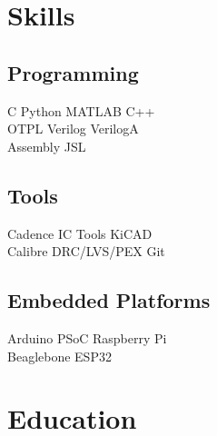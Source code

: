 \documentclass[]{deedy-resume-openfont}
\begin{document}
%
%

%
%

%
%

\begin{minipage}[t]{0.31\textwidth} 

\section{Skills}
\subsection{Programming}
C \textbullet{}   Python \textbullet{} MATLAB \textbullet{} C++ \\ 
OTPL \textbullet{} Verilog \textbullet{} VerilogA \\
Assembly \textbullet{} JSL
\sectionsep

\subsection{Tools}
Cadence IC Tools \textbullet{} KiCAD \\
Calibre DRC/LVS/PEX \textbullet{} Git
\sectionsep

\subsection{Embedded Platforms}
Arduino \textbullet{} PSoC \textbullet{} Raspberry Pi\\
Beaglebone \textbullet{} ESP32
\sectionsep


\section{Education} 


\end{minipage}
\end{document}
